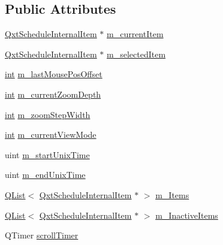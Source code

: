 \subsection*{Public Attributes}
\begin{DoxyCompactItemize}
\item 
\hyperlink{class_qxt_schedule_internal_item}{Qxt\-Schedule\-Internal\-Item} $\ast$ \hyperlink{class_qxt_schedule_view_private_adbd3d0ac27543a57b9f8690fab96ac6f}{m\-\_\-current\-Item}
\item 
\hyperlink{class_qxt_schedule_internal_item}{Qxt\-Schedule\-Internal\-Item} $\ast$ \hyperlink{class_qxt_schedule_view_private_a5060fd61796c43856fbac971da90b605}{m\-\_\-selected\-Item}
\item 
\hyperlink{ioapi_8h_a787fa3cf048117ba7123753c1e74fcd6}{int} \hyperlink{class_qxt_schedule_view_private_a493afa216b514a23862a183a388daf74}{m\-\_\-last\-Mouse\-Pos\-Offset}
\item 
\hyperlink{ioapi_8h_a787fa3cf048117ba7123753c1e74fcd6}{int} \hyperlink{class_qxt_schedule_view_private_a149d1085a5634b54038df67d5205bacc}{m\-\_\-current\-Zoom\-Depth}
\item 
\hyperlink{ioapi_8h_a787fa3cf048117ba7123753c1e74fcd6}{int} \hyperlink{class_qxt_schedule_view_private_a6835e926cbd90f1cb7e7a30c3cf715fc}{m\-\_\-zoom\-Step\-Width}
\item 
\hyperlink{ioapi_8h_a787fa3cf048117ba7123753c1e74fcd6}{int} \hyperlink{class_qxt_schedule_view_private_acf0f9a88b9225a5f1263a27914e6fc87}{m\-\_\-current\-View\-Mode}
\item 
uint \hyperlink{class_qxt_schedule_view_private_a53606665328fa6a63c4c951b101f275d}{m\-\_\-start\-Unix\-Time}
\item 
uint \hyperlink{class_qxt_schedule_view_private_ace36106f3daeff15a9fd29aec2b72c4c}{m\-\_\-end\-Unix\-Time}
\item 
\hyperlink{class_q_list}{Q\-List}$<$ \hyperlink{class_qxt_schedule_internal_item}{Qxt\-Schedule\-Internal\-Item} $\ast$ $>$ \hyperlink{class_qxt_schedule_view_private_a484aa797dad1ad0499937c02f5f687fc}{m\-\_\-\-Items}
\item 
\hyperlink{class_q_list}{Q\-List}$<$ \hyperlink{class_qxt_schedule_internal_item}{Qxt\-Schedule\-Internal\-Item} $\ast$ $>$ \hyperlink{class_qxt_schedule_view_private_a1346f58f4afdebcc45a229b726071b02}{m\-\_\-\-Inactive\-Items}
\item 
Q\-Timer \hyperlink{class_qxt_schedule_view_private_af44460008acd0aadd209e59a9841bbc0}{scroll\-Timer}
\item 

\end{DoxyCompactItemize}
